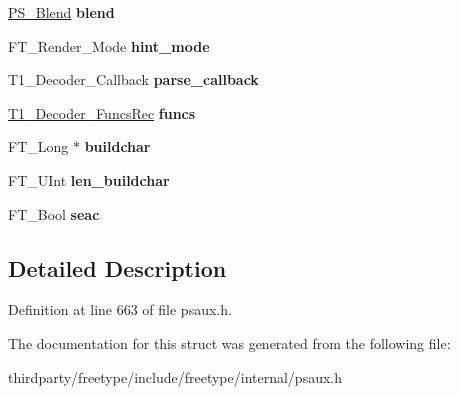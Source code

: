 \begin{DoxyCompactItemize}
\mbox{\label{struct_t1___decoder_rec___a0cd698c7041cb4f319949b62f215f7c7}} 
\hyperlink{struct_p_s___blend_rec__}{P\+S\+\_\+\+Blend} {\bfseries blend}
\item 
\mbox{\label{struct_t1___decoder_rec___a364b15149edb573dcc79be015eba61b4}} 
F\+T\+\_\+\+Render\+\_\+\+Mode {\bfseries hint\+\_\+mode}
\item 
\mbox{\label{struct_t1___decoder_rec___a840af0b01e7adb1e3aa521a936196b62}} 
T1\+\_\+\+Decoder\+\_\+\+Callback {\bfseries parse\+\_\+callback}
\item 
\mbox{\label{struct_t1___decoder_rec___a6b0f5f7cb3f44e88880aa9c927d79775}} 
\hyperlink{struct_t1___decoder___funcs_rec__}{T1\+\_\+\+Decoder\+\_\+\+Funcs\+Rec} {\bfseries funcs}
\item 
\mbox{\label{struct_t1___decoder_rec___a967ee06cbbdc8823be8f95df5db625b9}} 
F\+T\+\_\+\+Long $\ast$ {\bfseries buildchar}
\item 
\mbox{\label{struct_t1___decoder_rec___a55fd1c88d6f7badaec2aa13db17c816f}} 
F\+T\+\_\+\+U\+Int {\bfseries len\+\_\+buildchar}
\item 
\mbox{\label{struct_t1___decoder_rec___a45bf18b54ff973177ea3061ef0b705c6}} 
F\+T\+\_\+\+Bool {\bfseries seac}
\end{DoxyCompactItemize}


\subsection{Detailed Description}


Definition at line 663 of file psaux.\+h.



The documentation for this struct was generated from the following file\+:\begin{DoxyCompactItemize}
\item 
thirdparty/freetype/include/freetype/internal/psaux.\+h\end{DoxyCompactItemize}
